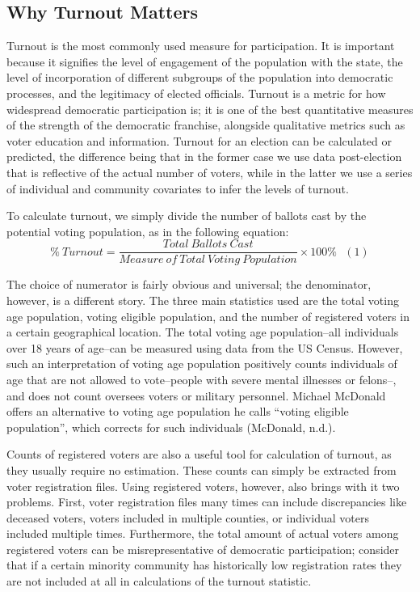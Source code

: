 \documentclass[12pt,twoside]{reedthesis}
\begin{document}
  \subsection{Why Turnout Matters}\label{why-turnout-matters}
  
  Turnout is the most commonly used measure for participation. It is
  important because it signifies the level of engagement of the population
  with the state, the level of incorporation of different subgroups of the
  population into democratic processes, and the legitimacy of elected
  officials. Turnout is a metric for how widespread democratic
  participation is; it is one of the best quantitative measures of the
  strength of the democratic franchise, alongside qualitative metrics such
  as voter education and information. Turnout for an election can be
  calculated or predicted, the difference being that in the former case we
  use data post-election that is reflective of the actual number of
  voters, while in the latter we use a series of individual and community
  covariates to infer the levels of turnout.
  
  To calculate turnout, we simply divide the number of ballots cast by the
  potential voting population, as in the following equation:\\
  \[ \% ~Turnout = \frac{Total~Ballots~Cast}{Measure~of~Total~Voting~Population}\times100\%~~~(1)\]
  
  The choice of numerator is fairly obvious and universal; the
  denominator, however, is a different story. The three main statistics
  used are the total voting age population, voting eligible population,
  and the number of registered voters in a certain geographical location.
  The total voting age population--all individuals over 18 years of
  age--can be measured using data from the US Census. However, such an
  interpretation of voting age population positively counts individuals of
  age that are not allowed to vote--people with severe mental illnesses or
  felons--, and does not count oversees voters or military personnel.
  Michael McDonald offers an alternative to voting age population he calls
  ``voting eligible population'', which corrects for such individuals
  (McDonald, n.d.).
  
  Counts of registered voters are also a useful tool for calculation of
  turnout, as they usually require no estimation. These counts can simply
  be extracted from voter registration files. Using registered voters,
  however, also brings with it two problems. First, voter registration
  files many times can include discrepancies like deceased voters, voters
  included in multiple counties, or individual voters included multiple
  times. Furthermore, the total amount of actual voters among registered
  voters can be misrepresentative of democratic participation; consider
  that if a certain minority community has historically low registration
  rates they are not included at all in calculations of the turnout
  statistic.
  
\end{document}
